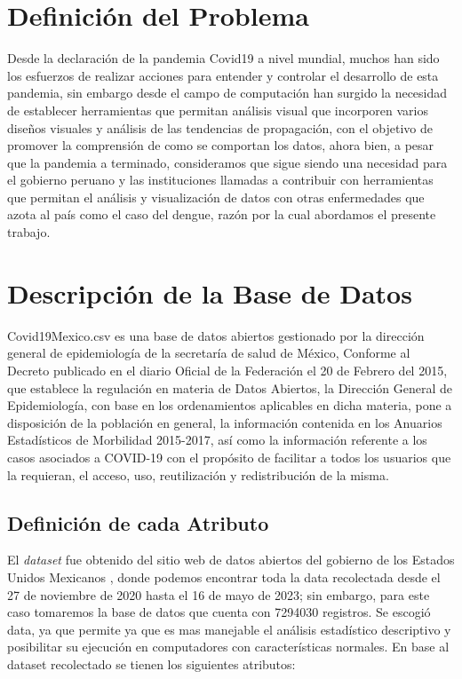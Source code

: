 %
%

\section{Definición del Problema}

Desde la declaración de la pandemia Covid19 a nivel mundial, muchos han sido los esfuerzos de realizar acciones para entender y controlar el desarrollo de esta pandemia, sin embargo desde el campo de computación han surgido la necesidad de establecer herramientas que permitan análisis visual  que incorporen varios diseños visuales y análisis de las tendencias de propagación, con el objetivo de promover la comprensión de como se comportan los datos, ahora bien, a pesar que la pandemia a terminado, consideramos que sigue siendo una necesidad para el gobierno peruano y las instituciones llamadas a contribuir con herramientas que permitan el análisis y visualización de datos con otras enfermedades que azota al país como el caso del dengue, razón por la cual abordamos el presente trabajo.


\section{Descripción de la Base de Datos}


Covid19Mexico.csv  es una base de datos abiertos gestionado por la dirección general de epidemiología de la secretaría de salud de México, Conforme al Decreto publicado en el diario Oficial de la Federación el 20 de Febrero del 2015, que establece la regulación en materia de Datos Abiertos, la Dirección General de Epidemiología, con base en los ordenamientos aplicables en dicha materia, pone a disposición de la población en general, la información contenida en los Anuarios Estadísticos de Morbilidad 2015-2017, así como la información referente a los casos asociados a COVID-19  con el propósito de facilitar a todos los usuarios que la requieran, el acceso, uso, reutilización y redistribución de la misma.


\subsection{Definición de cada Atributo}
El \textit{dataset} fue obtenido del sitio web de datos abiertos del gobierno de los Estados Unidos Mexicanos , donde podemos encontrar toda la data
recolectada desde el 27 de noviembre de 2020 hasta el 16 de mayo de 2023; sin embargo, para este caso  tomaremos la base de datos que cuenta con 7294030 registros. Se escogió data, ya que permite ya que es mas manejable el análisis estadístico descriptivo y posibilitar su ejecución en computadores con características normales. En base al dataset recolectado se tienen los siguientes atributos:

